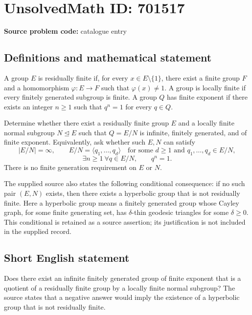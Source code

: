 \documentclass[11pt]{article}
\begin{document}
\section*{UnsolvedMath ID: 701517}
\textbf{Source problem code:} catalogue entry
\subsection{Definitions and mathematical statement}
A group \(E\) is residually finite if, for every \(x\in E\setminus\{1\}\), there exist a finite group \(F\) and a homomorphism \(\varphi:E\to F\) such that \(\varphi(x)\ne 1\). A group is locally finite if every finitely generated subgroup is finite. A group \(Q\) has finite exponent if there exists an integer \(n\ge 1\) such that \(q^n=1\) for every \(q\in Q\).

Determine whether there exist a residually finite group \(E\) and a locally finite normal subgroup \(N\trianglelefteq E\) such that \(Q=E/N\) is infinite, finitely generated, and of finite exponent. Equivalently, ask whether such \(E,N\) can satisfy
\[
|E/N|=\infty,\qquad E/N=\langle q_1,\ldots,q_d\rangle
\quad\text{for some }d\ge 1\text{ and }q_1,\ldots,q_d\in E/N,
\]
\[
\exists n\ge 1\ \forall q\in E/N,\qquad q^n=1.
\]
There is no finite generation requirement on \(E\) or \(N\).

The supplied source also states the following conditional consequence: if no such pair \((E,N)\) exists, then there exists a hyperbolic group that is not residually finite. Here a hyperbolic group means a finitely generated group whose Cayley graph, for some finite generating set, has \(\delta\)-thin geodesic triangles for some \(\delta\ge 0\). This conditional is retained as a source assertion; its justification is not included in the supplied record.
\subsection{Short English statement}
Does there exist an infinite finitely generated group of finite exponent that is a quotient of a residually finite group by a locally finite normal subgroup? The source states that a negative answer would imply the existence of a hyperbolic group that is not residually finite.
\end{document}
